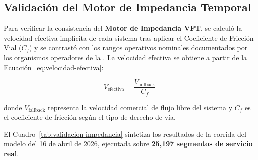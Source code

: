 \subsection{Validación del Motor de Impedancia Temporal}
\label{subsec:validacion-impedancia}

Para verificar la consistencia del \textbf{Motor de Impedancia VFT}, se calculó
la velocidad efectiva implícita de cada sistema tras aplicar el Coeficiente de
Fricción Vial ($C_f$) y se contrastó con los rangos operativos nominales
documentados por los organismos operadores de la \zmvm. La velocidad efectiva se
obtiene a partir de la Ecuación~\eqref{eq:velocidad-efectiva}:

\begin{equation}
    V_{\text{efectiva}} = \frac{V_{\text{fallback}}}{C_f}
    \label{eq:velocidad-efectiva}
\end{equation}

donde $V_{\text{fallback}}$ representa la velocidad comercial de flujo libre del
sistema y $C_f$ es el coeficiente de fricción según el tipo de derecho de vía.

\colorbox{azulRevision}{El Cuadro~\ref{tab:validacion-impedancia} sintetiza los resultados}
de la corrida del modelo del 16 de abril de 2026, ejecutada sobre
\textbf{25{,}197 segmentos de servicio real}.

